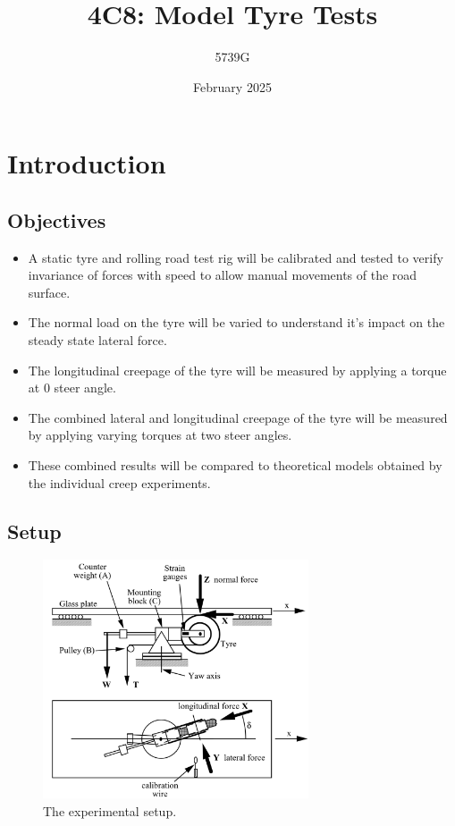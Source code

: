 \documentclass{article}
\begin{document}
\title{4C8: Model Tyre Tests}
\author{5739G}
\date{February 2025}
\maketitle 

\section{Introduction}

\subsection{Objectives}

\begin{itemize}
    \item A static tyre and rolling road test rig will be calibrated and tested to verify invariance of forces with speed to allow manual movements of the road surface.
    \item The normal load on the tyre will be varied to understand it's impact on the steady state lateral force.
    \item The longitudinal creepage of the tyre will be measured by applying a torque at 0 steer angle.
    \item The combined lateral and longitudinal creepage of the tyre will be measured by applying varying torques at two steer angles.
    \item These combined results will be compared to theoretical models obtained by the individual creep experiments.
\end{itemize}

\subsection{Setup}

\begin{figure}[H]
    \centering
    \includegraphics[width=0.7\textwidth]{photos/setup.png}
    \caption{The experimental setup.}
    \label{fig:setup}
\end{figure}
\end{document}
